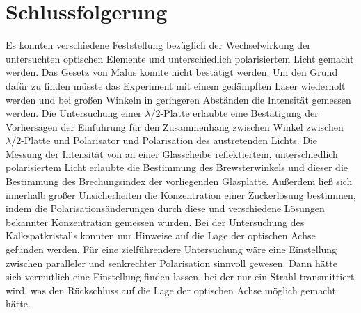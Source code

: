 \documentclass[
	a4paper,
	12pt,
	pagesize,
	ngerman
]{scrartcl}
\begin{document}
	\section{Schlussfolgerung}
	Es konnten verschiedene Feststellung bezüglich der Wechselwirkung der untersuchten optischen Elemente und unterschiedlich polarisiertem Licht gemacht werden.
	Das Gesetz von Malus konnte nicht bestätigt werden.
	Um den Grund dafür zu finden müsste das Experiment mit einem gedämpften Laser wiederholt werden und bei großen Winkeln in geringeren Abständen die Intensität gemessen werden.
	Die Untersuchung einer $\lambda/2$-Platte erlaubte eine Bestätigung der Vorhersagen der Einführung für den Zusammenhang zwischen Winkel zwischen $\lambda/2$-Platte und Polarisator und Polarisation des austretenden Lichts.
	Die Messung der Intensität von an einer Glasscheibe reflektiertem, unterschiedlich polarisiertem Licht erlaubte die Bestimmung des Brewsterwinkels und dieser die Bestimmung des Brechungsindex der vorliegenden Glasplatte.
	Außerdem ließ sich innerhalb großer Unsicherheiten die Konzentration einer Zuckerlösung bestimmen, indem die Polarisationsänderungen durch diese und verschiedene Lösungen bekannter Konzentration gemessen wurden.
	Bei der Untersuchung des Kalkspatkristalls konnten nur Hinweise auf die Lage der optischen Achse gefunden werden.
	Für eine zielführendere Untersuchung wäre eine Einstellung zwischen paralleler und senkrechter Polarisation sinnvoll gewesen.
	Dann hätte sich vermutlich eine Einstellung finden lassen, bei der nur ein Strahl transmittiert wird, was den Rückschluss auf die Lage der optischen Achse möglich gemacht hätte.
	
	\printbibliography
\end{document}
